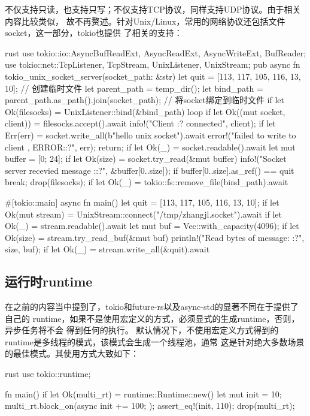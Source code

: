 不仅支持只读，也支持只写；不仅支持TCP协议，同样支持UDP协议。由于相关内容比较类似，
故不再赘述。针对Unix/Linux，常用的网络协议还包括文件socket，这一部分，tokio也提供
了相关的支持：
\begin{code-block}{rust}
use tokio::io::{AsyncBufReadExt, AsyncReadExt, AsyncWriteExt, BufReader};
use tokio::net::{TcpListener, TcpStream, UnixListener, UnixStream};
pub async fn tokio_unix_socket_server(socket_path: &str) {
    let quit = [113, 117, 105, 116, 13, 10];
    // 创建临时文件
    let parent_path = temp_dir();
    let bind_path = parent_path.as_path().join(socket_path);
    // 将socket绑定到临时文件
    if let Ok(filesocks) = UnixListener::bind(&bind_path) {
        loop {
            if let Ok((mut socket, client)) = filesocks.accept().await {
                info!("Client {:?} connected", client);
                if let Err(err) = socket.write_all(b"hello unix socket").await {
                    error!("failed to write to client , ERROR:{:?}", err);
                    return;
                }
                if let Ok(_) = socket.readable().await {
                    let mut buffer = [0; 24];
                    if let Ok(size) = socket.try_read(&mut buffer) {
                        info!("Socket server recevied message :{:?}",
                                &buffer[0..size]);
                        if buffer[0..size].as_ref() == quit {
                            break;
                        }
                    }
                }
            }
        }
        drop(filesocks);
        if let Ok(_) = tokio::fs::remove_file(bind_path).await {}
    }
}

#[tokio::main]
async fn main() {
    let quit = [113, 117, 105, 116, 13, 10];
    if let Ok(mut stream) = UnixStream::connect("/tmp/zhangjl.socket").await {
        if let Ok(_) = stream.readable().await {
            let mut buf = Vec::with_capacity(4096);
            if let Ok(size) = stream.try_read_buf(&mut buf) {
                println!("Read {} bytes of message: {:?}", size, buf);
            }
            if let Ok(_) = stream.write_all(&quit).await {}
        }
    }
}
\end{code-block}

\subsection{运行时runtime}
在之前的内容当中提到了，tokio和future-rs以及async-std的显著不同在于提供了自己的
runtime，如果不是使用宏定义的方式，必须显式的生成runtime，否则，异步任务将不会
得到任何的执行。
默认情况下，不使用宏定义方式得到的runtime是多线程的模式，该模式会生成一个线程池，通常
这是针对绝大多数场景的最佳模式。其使用方式大致如下：
\begin{code-block}{rust}
use tokio::runtime;

fn main() {
    if let Ok(multi_rt) = runtime::Runtime::new() {
        let mut init = 10;
        multi_rt.block_on(async {
            init += 100;
        });
        assert_eq!(init, 110);
        drop(multi_rt);
    }
}
\end{code-block}

